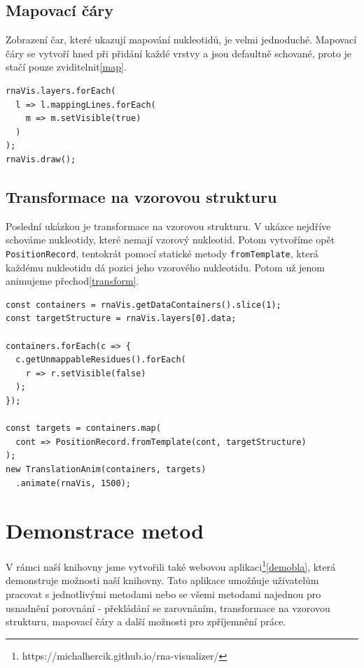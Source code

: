 \subsection{Mapovací čáry}

Zobrazení čar, které ukazují mapování nukleotidů, je velmi jednoduché.
Mapovací čáry se vytvoří hned při přidání každé vrstvy a jsou defaultně
schované, proto je stačí pouze zviditelnit\ref{map}.

\begin{lstlisting}[caption={Zobrazení mapovacích čar}, label=map]
rnaVis.layers.forEach(
  l => l.mappingLines.forEach(
    m => m.setVisible(true)
  )
);
rnaVis.draw();
\end{lstlisting}

\subsection{Transformace na vzorovou strukturu}

Poslední ukázkou je transformace na vzorovou strukturu. V ukázce nejdříve
schováme nukleotidy, které nemají vzorový nukleotid. Potom vytvoříme opět
\texttt{PositionRecord}, tentokrát pomocí statické metody
\texttt{fromTemplate}, která každému nukleotidu dá pozici jeho vzorového
nukleotidu. Potom už jenom animujeme přechod\ref{transform}.

\begin{lstlisting}[caption={Transformace na vzorovou strukturu}, label=transform]
const containers = rnaVis.getDataContainers().slice(1);
const targetStructure = rnaVis.layers[0].data;

containers.forEach(c => {
  c.getUnmappableResidues().forEach(
    r => r.setVisible(false)
  );
});

const targets = containers.map(
  cont => PositionRecord.fromTemplate(cont, targetStructure)
);
new TranslationAnim(containers, targets)
  .animate(rnaVis, 1500);
\end{lstlisting}

\section{Demonstrace metod}

V rámci naší knihovny jsme vytvořili také webovou
aplikaci\footnote{https://michalhercik.github.io/rna-visualizer/}\ref{demobla},
která demonstruje možnosti naší knihovny. Tato aplikace umožňuje uživatelům
pracovat s jednotlivými metodami nebo se všemi metodami najednou pro usnadnění
porovnání - překládání se zarovnáním, transformace na vzorovou strukturu,
mapovací čáry a další možnosti pro zpříjemnění práce. 

